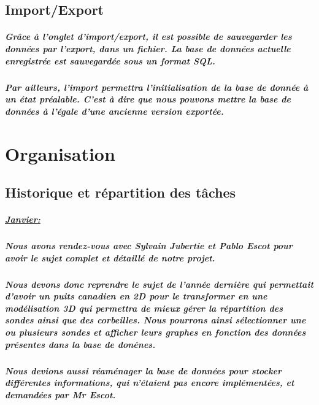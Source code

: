 \documentclass[12pt , a4paper,titlepage]{report}
\begin{document}
 \section{Import/Export}
 \paragraph{   Grâce à l'onglet d'import/export, il est possible de sauvegarder les données par l'export, dans un fichier. La base de 
 données actuelle enregistrée est sauvegardée sous un format SQL.}
 \paragraph{   Par ailleurs, l'import permettra l'initialisation de la base de donnée à un état préalable. C'est à dire que nous 
 pouvons mettre la base de données à l'égale d'une ancienne version exportée.} 





 \chapter{Organisation}
 \section{Historique et répartition des tâches}
 \paragraph{\underline {Janvier:}}
 \paragraph{   Nous avons rendez-vous avec Sylvain Jubertie et Pablo Escot pour avoir le sujet complet et détaillé de notre projet.}
 \paragraph{   Nous devons donc reprendre le sujet de l'année dernière qui permettait d'avoir un puits canadien en 2D pour le transformer
 en une modélisation 3D qui permettra de mieux gérer la répartition des sondes ainsi que des corbeilles. Nous pourrons ainsi sélectionner
 une ou plusieurs sondes et afficher leurs graphes en fonction des données présentes dans la base de donénes.}
 \paragraph{   Nous devions aussi réaménager la base de données pour stocker différentes informations, qui n'étaient pas encore 
 implémentées, et demandées par Mr Escot.}
\end{document}
